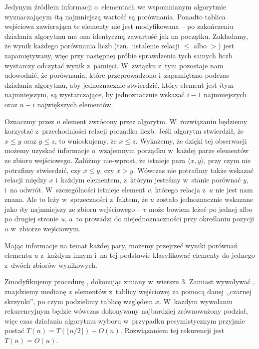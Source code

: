 \exercise %
Jedynym źródłem informacji o~elementach we wspomnianym algorytmie wyznaczającym $i$\nbhyphen tą najmniejszą wartość są porównania.
Ponadto tablica wejściowa zawierająca te elementy nie jest modyfikowana -- po zakończeniu działania algorytmu ma ona identyczną zawartość jak na początku.
Zakładamy, że wynik każdego porównania liczb (tzn.\ ustalenie relacji $\le$ albo $>$) jest zapamiętywany, więc przy następnej próbie sprawdzenia tych samych liczb wystarczy odczytać wynik z~pamięci.
W~związku z~tym pozostaje nam udowodnić, że porównania, które przeprowadzono i~zapamiętano podczas działania algorytmu, aby jednoznacznie stwierdzić, który element jest $i$\nbhyphen tym najmniejszym, są wystarczające, by jednoznacznie wskazać $i-1$ najmniejszych oraz $n-i$ największych elementów.

Oznaczmy przez $u$ element zwrócony przez algorytm.
W~rozwiązaniu będziemy korzystać z~przechodniości relacji porządku liczb.
Jeśli algorytm stwierdził, że $x\le y$ oraz $y\le z$, to wnioskujemy, że $x\le z$.
Wykażemy, że dzięki tej obserwacji możemy uzyskać informacje o~wzajemnym porządku w~każdej parze elementów ze zbioru wejściowego.
Załóżmy nie-wprost, że istnieje para $\langle x,y\rangle$, przy czym nie potrafimy stwierdzić, czy $x\le y$, czy $x>y$.
Wówczas nie potrafimy także wskazać relacji między $x$ i~każdym elementem, z~którym jesteśmy w~stanie porównać $y$, i~na odwrót.
W~szczególności istnieje element $v$, którego relacja z~$u$ nie jest nam znana.
Ale to leży w~sprzeczności z~faktem, że $u$ zostało jednoznacznie wskazane jako $i$\nbhyphen ty najmniejszy ze zbioru wejściowego -- $v$ może bowiem leżeć po jednej albo po drugiej stronie $u$, a~to prowadzi do niejednoznaczności przy określaniu pozycji $u$ w~zbiorze wejściowym.

Mając informacje na temat każdej pary, możemy przejrzeć wyniki porównań elementu $u$ z~każdym innym i~na tej podstawie klasyfikować elementy do jednego z~dwóch zbiorów wynikowych.

\exercise %
Zmodyfikujemy procedurę , dokonując zmiany w~wierszu 3.
Zamiast wywoływać , znajdziemy medianę $x$ elementów z~tablicy wejściowej za pomocą danej ,,czarnej skrzynki'', po czym podzielimy tablicę względem $x$.
W~każdym wywołaniu rekurencyjnym będzie wówczas dokonywany najbardziej zrównoważony podział, więc czas działania algorytmu wyboru w~przypadku pesymistycznym przyjmie postać $T(n)=T(\lfloor n/2\rfloor)+O(n)$.
Rozwiązaniem tej rekurencji jest $T(n)=O(n)$.

